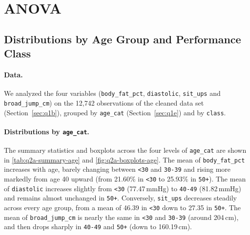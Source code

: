 \section{ANOVA}\label{sec:q2}

\subsection{Distributions by Age Group and Performance Class}\label{sec:q2a}


\paragraph{Data.}
We analyzed the four variables (\texttt{body\_fat\_pct}, \texttt{diastolic}, \texttt{sit\_ups} and \texttt{broad\_jump\_cm}) on the 12,742 observations of the cleaned data set (Section~\ref{sec:q1b}), grouped by \texttt{age\_cat} (Section~\ref{sec:q1e}) and by \texttt{class}.

\paragraph{Distributions by \texttt{age\_cat}.}
The summary statistics and boxplots across the four levels of \texttt{age\_cat} are shown in \autoref{tab:q2a-summary-age} and \autoref{fig:q2a-boxplots-age}.
The mean of \texttt{body\_fat\_pct} increases with age, barely changing between \texttt{<30} and \texttt{30-39} and rising more markedly from age 40 upward (from 21.60\% in \texttt{<30} to 25.93\% in \texttt{50+}).
The mean of \texttt{diastolic} increases slightly from \texttt{<30} (77.47\,mmHg) to \texttt{40-49} (81.82\,mmHg) and remains almost unchanged in \texttt{50+}.
Conversely, \texttt{sit\_ups} decreases steadily across every age group, from a mean of 46.39 in \texttt{<30} down to 27.35 in \texttt{50+}.
The mean of \texttt{broad\_jump\_cm} is nearly the same in \texttt{<30} and \texttt{30-39} (around 204\,cm), and then drops sharply in \texttt{40-49} and \texttt{50+} (down to 160.19\,cm).

